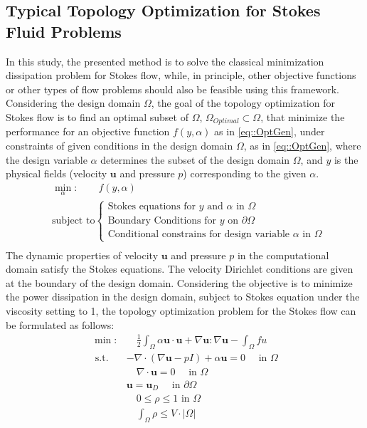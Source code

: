\documentclass{article}
\begin{document}
\subsection{Typical Topology Optimization for Stokes Fluid Problems}
In this study, the presented method is to solve the classical minimization dissipation problem for Stokes flow, while, in principle, other objective functions or other types of flow problems should also be feasible using this framework. Considering the design domain $\Omega$, the goal of the topology optimization for Stokes flow is to find an optimal subset of $\Omega$, $\Omega_{Optimal} \subset \Omega$, that minimize the performance for an objective function $f(y, \alpha)$ as in \eqref{eq::OptGen}, under constraints of given conditions in the design domain $\Omega$, as in \eqref{eq::OptGen}, where the design variable $\alpha$ determines the subset of the design domain $\Omega$, and $y$ is the physical fields (velocity $\mathbf{u}$ and pressure $p$) corresponding to the given $\alpha$.
\begin{equation}\label{eq::OptGen}
\begin{aligned}
& \min_\alpha:  \quad \quad  f(y, \alpha) \\
& \text {subject to}\left\{\begin{array}{l}
\text{Stokes equations for $y$ and $\alpha$ in $\Omega$} \\
\text{Boundary Conditions for $y$ on $\partial \Omega$} \\
\text{Conditional constrains for design variable $\alpha$ in $\Omega$}
\end{array}\right. \\
\end{aligned}
\end{equation}
The dynamic properties of velocity $\boldsymbol{u}$ and pressure $p$ in the computational domain satisfy the Stokes equations. The velocity Dirichlet conditions are given at the boundary of the design domain. Considering the objective is to minimize the power dissipation in the design domain,  subject to Stokes equation under the viscosity setting to 1, the topology optimization problem for the Stokes flow can be formulated as follows:
\begin{equation}\label{eq::FluidOpt}
\begin{aligned}
 \min : & \quad \frac{1}{2} \int_{\Omega} \alpha \boldsymbol{u} \cdot \boldsymbol{u}+\nabla \boldsymbol{u}: \nabla \boldsymbol{u}-\int_{\Omega} f u \\
 \text { s.t. } & -\nabla \cdot(\nabla \boldsymbol{u}-p I)+\alpha \boldsymbol{u}=0 \quad \text { in } \Omega \\
& \quad \nabla \cdot \boldsymbol{u}=0 \quad \text { in } \Omega \\
& \boldsymbol{u} = \boldsymbol{u}_D \quad \text { in } 
 \partial \Omega \\
& \quad 0 \leq \rho \leq 1 \text { in } \Omega \\
& \quad \int_{\Omega} \rho \leq V \cdot|\Omega|
\end{aligned}
\end{equation}
\end{document}
